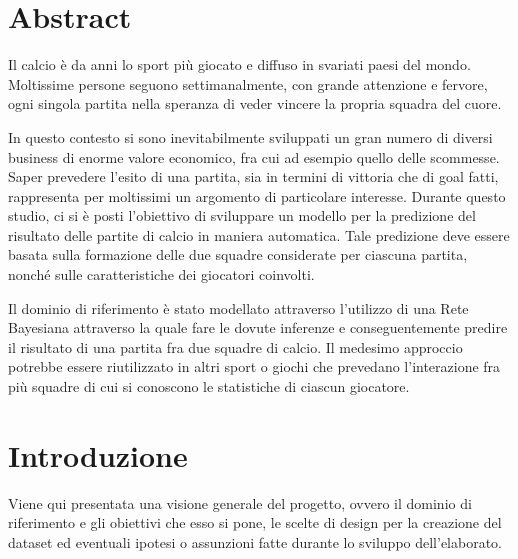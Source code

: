 \documentclass[hidelinks, 12pt]{article}
\begin{document}

\tableofcontents
\pagebreak




\section{Abstract}

Il calcio è da anni lo sport più giocato e diffuso in svariati paesi del mondo. Moltissime persone seguono settimanalmente, con grande attenzione e fervore, ogni singola partita nella speranza di veder vincere la propria squadra del cuore.

In questo contesto si sono inevitabilmente sviluppati un gran numero di diversi business di enorme valore economico, fra cui ad esempio quello delle scommesse. Saper prevedere l'esito di una partita, sia in termini di vittoria che di goal fatti, rappresenta per moltissimi un argomento di particolare interesse. Durante questo studio, ci si è posti l'obiettivo di sviluppare un modello per la predizione del risultato delle partite di calcio in maniera automatica. Tale predizione deve essere basata sulla formazione delle due squadre considerate per ciascuna partita, nonché sulle caratteristiche dei giocatori coinvolti.

Il dominio di riferimento è stato modellato attraverso l'utilizzo di una Rete Bayesiana attraverso la quale fare le dovute inferenze e conseguentemente predire il risultato di una partita fra due squadre di calcio. Il medesimo approccio potrebbe essere riutilizzato in altri sport o giochi che prevedano l'interazione fra più squadre di cui si conoscono le statistiche di ciascun giocatore.



\clearpage



\section{Introduzione}

Viene qui presentata una visione generale del progetto, ovvero il dominio di riferimento e gli obiettivi che esso si pone, le scelte di design per la creazione del dataset ed eventuali ipotesi o assunzioni fatte durante lo sviluppo dell'elaborato.
\end{document}
